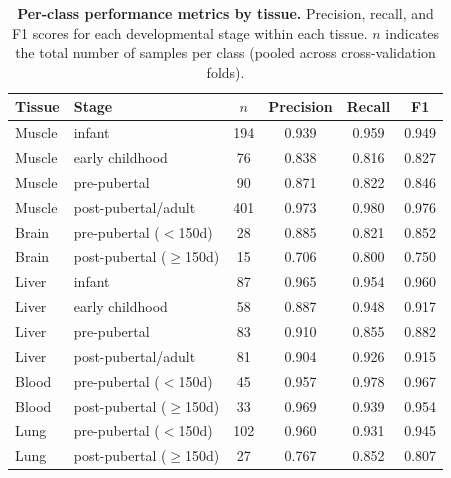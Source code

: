 \vspace{1cm}

\begin{table}[H]
  \centering
  \caption{\textbf{Per-class performance metrics by tissue.} Precision, recall, and F1 scores for each developmental stage within each tissue. $n$ indicates the total number of samples per class (pooled across cross-validation folds).}
  \label{tab:S2}
  \small
  \begin{tabular}{llcccc}
    \toprule
    Tissue & Stage & $n$ & Precision & Recall & F1 \\
    \midrule
    Muscle & infant & 194 & 0.939 & 0.959 & 0.949 \\
    Muscle & early childhood & 76 & 0.838 & 0.816 & 0.827 \\
    Muscle & pre-pubertal & 90 & 0.871 & 0.822 & 0.846 \\
    Muscle & post-pubertal/adult & 401 & 0.973 & 0.980 & 0.976 \\
    \midrule
    Brain & pre-pubertal ($<$150d) & 28 & 0.885 & 0.821 & 0.852 \\
    Brain & post-pubertal ($\geq$150d) & 15 & 0.706 & 0.800 & 0.750 \\
    \midrule
    Liver & infant & 87 & 0.965 & 0.954 & 0.960 \\
    Liver & early childhood & 58 & 0.887 & 0.948 & 0.917 \\
    Liver & pre-pubertal & 83 & 0.910 & 0.855 & 0.882 \\
    Liver & post-pubertal/adult & 81 & 0.904 & 0.926 & 0.915 \\
    \midrule
    Blood & pre-pubertal ($<$150d) & 45 & 0.957 & 0.978 & 0.967 \\
    Blood & post-pubertal ($\geq$150d) & 33 & 0.969 & 0.939 & 0.954 \\
    \midrule
    Lung & pre-pubertal ($<$150d) & 102 & 0.960 & 0.931 & 0.945 \\
    Lung & post-pubertal ($\geq$150d) & 27 & 0.767 & 0.852 & 0.807 \\
    \bottomrule
  \end{tabular}

\end{table}


